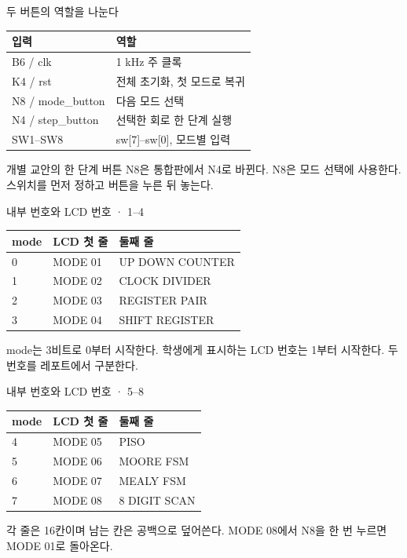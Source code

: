 \begin{frame}{두 버튼의 역할을 나눈다}
\small
\begin{center}\renewcommand{\arraystretch}{1.55}\begin{tabular}{ll}
입력 & 역할\\\hline
B6 / clk & 1 kHz 주 클록\\
K4 / rst & 전체 초기화, 첫 모드로 복귀\\
N8 / mode\_button & 다음 모드 선택\\
N4 / step\_button & 선택한 회로 한 단계 실행\\
SW1–SW8 & sw[7]–sw[0], 모드별 입력\\
\end{tabular}\end{center}개별 교안의 한 단계 버튼 N8은 통합판에서 N4로 바뀐다. N8은 모드 선택에 사용한다. 스위치를 먼저 정하고 버튼을 누른 뒤 놓는다.\par
\end{frame}

\begin{frame}{내부 번호와 LCD 번호 · 1–4}
\small
\begin{center}\renewcommand{\arraystretch}{1.55}\begin{tabular}{lll}
mode & LCD 첫 줄 & 둘째 줄\\\hline
0 & MODE 01 & UP DOWN COUNTER\\
1 & MODE 02 & CLOCK DIVIDER\\
2 & MODE 03 & REGISTER PAIR\\
3 & MODE 04 & SHIFT REGISTER\\
\end{tabular}\end{center}mode는 3비트로 0부터 시작한다. 학생에게 표시하는 LCD 번호는 1부터 시작한다. 두 번호를 레포트에서 구분한다.\par
\end{frame}

\begin{frame}{내부 번호와 LCD 번호 · 5–8}
\small
\begin{center}\renewcommand{\arraystretch}{1.55}\begin{tabular}{lll}
mode & LCD 첫 줄 & 둘째 줄\\\hline
4 & MODE 05 & PISO\\
5 & MODE 06 & MOORE FSM\\
6 & MODE 07 & MEALY FSM\\
7 & MODE 08 & 8 DIGIT SCAN\\
\end{tabular}\end{center}각 줄은 16칸이며 남는 칸은 공백으로 덮어쓴다. MODE 08에서 N8을 한 번 누르면 MODE 01로 돌아온다.\par
\end{frame}

